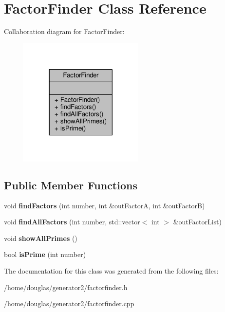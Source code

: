 \hypertarget{classFactorFinder}{}\section{Factor\+Finder Class Reference}
\label{classFactorFinder}


Collaboration diagram for Factor\+Finder\+:
\nopagebreak
\begin{figure}[H]
\begin{center}
\leavevmode
\includegraphics[width=177pt]{classFactorFinder__coll__graph}
\end{center}
\end{figure}
\subsection*{Public Member Functions}
\begin{DoxyCompactItemize}
\item 
void {\bfseries find\+Factors} (int number, int \&out\+FactorA, int \&out\+FactorB)\hypertarget{classFactorFinder_aab480bdfe42adc80d00390b10f453665}{}\label{classFactorFinder_aab480bdfe42adc80d00390b10f453665}

\item 
void {\bfseries find\+All\+Factors} (int number, std\+::vector$<$ int $>$ \&out\+Factor\+List)\hypertarget{classFactorFinder_a3482682d018ac13f6d67a5c35649dd5e}{}\label{classFactorFinder_a3482682d018ac13f6d67a5c35649dd5e}

\item 
void {\bfseries show\+All\+Primes} ()\hypertarget{classFactorFinder_af4530a2fc1067443eb4425867cc6c781}{}\label{classFactorFinder_af4530a2fc1067443eb4425867cc6c781}

\item 
bool {\bfseries is\+Prime} (int number)\hypertarget{classFactorFinder_a056c479dacb381b63cfd2a6e429219c1}{}\label{classFactorFinder_a056c479dacb381b63cfd2a6e429219c1}

\end{DoxyCompactItemize}


The documentation for this class was generated from the following files\+:\begin{DoxyCompactItemize}
\item 
/home/douglas/generator2/factorfinder.\+h\item 
/home/douglas/generator2/factorfinder.\+cpp\end{DoxyCompactItemize}
